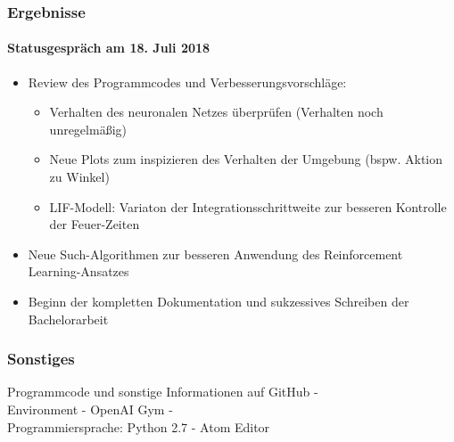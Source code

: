 \documentclass[10pt,t,aspectratio=1610]{beamer}
\begin{document}

\begin{frame}
  \frametitle{Ergebnisse}
  \framesubtitle{Statusgespräch am 18. Juli 2018}

  \begin{itemize}
  	\item Review des Programmcodes und Verbesserungsvorschläge:
  	\begin{itemize}
  		\item Verhalten des neuronalen Netzes überprüfen (Verhalten noch unregelmäßig)
  		\item Neue Plots zum inspizieren des Verhalten der Umgebung (bspw. Aktion zu Winkel)
  		\item LIF-Modell: Variaton der Integrationsschrittweite zur besseren Kontrolle der Feuer-Zeiten
  	\end{itemize}
  	\item Neue Such-Algorithmen zur besseren Anwendung des Reinforcement Learning-Ansatzes
  	\item Beginn der kompletten Dokumentation und sukzessives Schreiben der Bachelorarbeit
  \end{itemize}

\end{frame}


\begin{frame}
  \frametitle{Sonstiges}
  
  Programmcode und sonstige Informationen auf GitHub - \href{https://github.com/J0nasW/BA}{}\\
  \vspace{1cm}
  Environment - OpenAI Gym - \href{https://gym.openai.com/envs/CartPole-v0/}{}\\
  \vspace{1cm}
  Programmiersprache: Python 2.7 - Atom Editor\\

\end{frame}




\ClosingSlide
\end{document}
